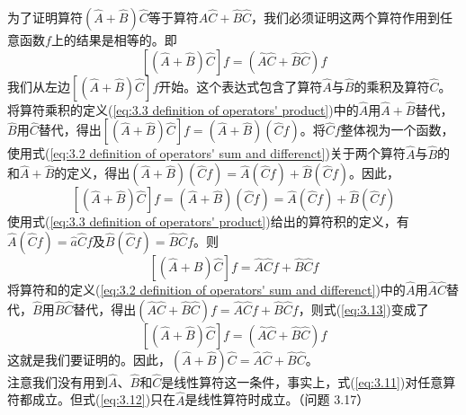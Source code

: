 \begin{examplebox}
		为了证明算符$\left(\hat{A}+\hat{B}\right)\hat{C}$等于算符$\hat{A}\hat{C}+\hat{B}\hat{C}$，我们必须证明这两个算符作用到任意函数$f$上的结果是相等的。即
		\begin{equation*}
			\left[\left(\hat{A}+\hat{B}\right)\hat{C}\right]f = \left(\hat{A}\hat{C}+\hat{B}\hat{C}\right)f
		\end{equation*}
		我们从左边$\left[\left(\hat{A}+\hat{B}\right)\hat{C}\right]f$开始。这个表达式包含了算符$\hat{A}$与$\hat{B}$的乘积及算符$\hat{C}$。将算符乘积的定义(\ref{eq:3.3 definition of operators' product})中的$\hat{A}$用$\hat{A}+\hat{B}$替代，$\hat{B}$用$\hat{C}$替代，得出$\left[\left(\hat{A}+\hat{B}\right)\hat{C}\right]f = \left(\hat{A}+\hat{B}\right)\left(\hat{C}f\right)$。将$\hat{C}f$整体视为一个函数，使用式(\ref{eq:3.2 definition of operators' sum and differenct})关于两个算符$\hat{A}$与$\hat{B}$的和$\hat{A}+\hat{B}$的定义，得出$\left(\hat{A}+\hat{B}\right)\left(\hat{C}f\right) = \hat{A}\left(\hat{C}f\right)+\hat{B}\left(\hat{C}f\right)$。因此，
		\begin{equation*}
			\left[\left(\hat{A}+\hat{B}\right)\hat{C}\right]f = \left(\hat{A}+\hat{B}\right)\left(\hat{C}f\right) = \hat{A}\left(\hat{C}f\right)+\hat{B}\left(\hat{C}f\right)
		\end{equation*}
		使用式(\ref{eq:3.3 definition of operators' product})给出的算符积的定义，有$\hat{A}\left(\hat{C}f\right) = \hat{a}\hat{C}f$及$\hat{B}\left(\hat{C}f\right) = \hat{B}\hat{C}f$。则
		\begin{equation}
			\left[\left(\hat{A}+\hat{B}\right)\hat{C}\right]f = \hat{A}\hat{C}f+\hat{B}\hat{C}f
			\label{eq:3.13}
		\end{equation}
		将算符和的定义(\ref{eq:3.2 definition of operators' sum and differenct})中的$\hat{A}$用$\hat{A}\hat{C}$替代，$\hat{B}$用$\hat{B}\hat{C}$替代，得出$\left(\hat{A}\hat{C}+\hat{B}\hat{C}\right)f = \hat{A}\hat{C}f+\hat{B}\hat{C}f$，则式(\ref{eq:3.13})变成了
		\begin{equation*}
			\left[\left(\hat{A}+\hat{B}\right) \hat{C}\right]f = \left(\hat{A}\hat{C}+\hat{B}\hat{C}\right)f
		\end{equation*}
		这就是我们要证明的。因此，$\left(\hat{A}+\hat{B}\right)\hat{C} = \hat{A}\hat{C}+\hat{B}\hat{C}$。\\
		注意我们没有用到$\hat{A}$、$\hat{B}$和$\hat{C}$是线性算符这一条件，事实上，式(\ref{eq:3.11})对任意算符都成立。但式(\ref{eq:3.12})只在$\hat{A}$是线性算符时成立。（问题 3.17）
	\end{examplebox}
